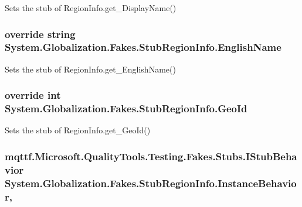 Sets the stub of Region\-Info.\-get\-\_\-\-Display\-Name()

\hypertarget{class_system_1_1_globalization_1_1_fakes_1_1_stub_region_info_a5ad17251a864d807990313459a239091}{
\subsubsection[{English\-Name}]{\setlength{\rightskip}{0pt plus 5cm}override string System.\-Globalization.\-Fakes.\-Stub\-Region\-Info.\-English\-Name\hspace{0.3cm}{\ttfamily [get]}}}\label{class_system_1_1_globalization_1_1_fakes_1_1_stub_region_info_a5ad17251a864d807990313459a239091}


Sets the stub of Region\-Info.\-get\-\_\-\-English\-Name()

\hypertarget{class_system_1_1_globalization_1_1_fakes_1_1_stub_region_info_ac2e3e0451e91bd1fab2dc4a1fb5167f6}{
\subsubsection[{Geo\-Id}]{\setlength{\rightskip}{0pt plus 5cm}override int System.\-Globalization.\-Fakes.\-Stub\-Region\-Info.\-Geo\-Id\hspace{0.3cm}{\ttfamily [get]}}}\label{class_system_1_1_globalization_1_1_fakes_1_1_stub_region_info_ac2e3e0451e91bd1fab2dc4a1fb5167f6}


Sets the stub of Region\-Info.\-get\-\_\-\-Geo\-Id()

\hypertarget{class_system_1_1_globalization_1_1_fakes_1_1_stub_region_info_abe5ab7e7c8e4f9be64d6352621a4a6d6}{
\subsubsection[{Instance\-Behavior}]{\setlength{\rightskip}{0pt plus 5cm}mqttf.\-Microsoft.\-Quality\-Tools.\-Testing.\-Fakes.\-Stubs.\-I\-Stub\-Behavior System.\-Globalization.\-Fakes.\-Stub\-Region\-Info.\-Instance\-Behavior\hspace{0.3cm}{\ttfamily [get]}, {\ttfamily [set]}}}\label{class_system_1_1_globalization_1_1_fakes_1_1_stub_region_info_abe5ab7e7c8e4f9be64d6352621a4a6d6}


